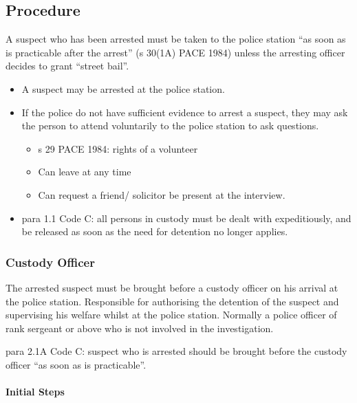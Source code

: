 \documentclass[
]{article}
\providecommand{\tightlist}{%
  \setlength{\itemsep}{0pt}\setlength{\parskip}{0pt}}
\begin{document}
\hypertarget{procedure}{%
\subsection{Procedure}\label{procedure}}

A suspect who has been arrested must be taken to the police station ``as
soon as is practicable after the arrest'' (s 30(1A) PACE 1984) unless
the arresting officer decides to grant ``street bail''.

\begin{itemize}
\tightlist
\item
  A suspect may be arrested at the police station.
\item
  If the police do not have sufficient evidence to arrest a suspect,
  they may ask the person to attend voluntarily to the police station to
  ask questions.

  \begin{itemize}
  \tightlist
  \item
    s 29 PACE 1984: rights of a volunteer
  \item
    Can leave at any time
  \item
    Can request a friend/ solicitor be present at the interview.
  \end{itemize}
\item
  para 1.1 Code C: all persons in custody must be dealt with
  expeditiously, and be released as soon as the need for detention no
  longer applies.
\end{itemize}

\hypertarget{custody-officer}{%
\subsubsection{Custody Officer}\label{custody-officer}}

The arrested suspect must be brought before a custody officer on his
arrival at the police station. Responsible for authorising the detention
of the suspect and supervising his welfare whilst at the police station.
Normally a police officer of rank sergeant or above who is not involved
in the investigation.

para 2.1A Code C: suspect who is arrested should be brought before the
custody officer ``as soon as is practicable''.

\hypertarget{initial-steps}{%
\paragraph{Initial Steps}\label{initial-steps}}
\end{document}
